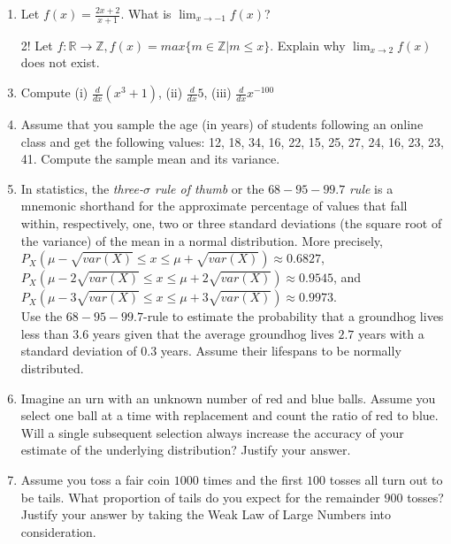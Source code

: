 \documentclass{article}
\begin{document}
\begin{enumerate}
	\item Let $f(x) = \frac{2x + 2}{x + 1}$. What is $\lim_{x \to -1} f(x)$?
	\item[2!] Let $f: \mathbb{R} \to \mathbb{Z}, f(x) = max\{m \in \mathbb{Z} | m \leq x\}$. Explain why $\lim_{x \to 2} f(x)$ does not exist. 
	\item Compute (i) $\frac{d}{dx}(x^3 + 1)$, (ii) $\frac{d}{dx}5$, (iii) $\frac{d}{dx} x^{-100}$
	\item Assume that you sample the age (in years) of students following an online class and get the following values: 12, 18, 34, 16, 22, 15, 25, 27, 24, 16, 23, 23, 41. Compute the sample mean and its variance.
	\item In statistics, the {\em three-$\sigma$ rule of thumb} or the $68-95-99.7$ {\em rule} is a mnemonic shorthand for the approximate percentage of values that fall within, respectively, one, two or three standard deviations (the square root of the variance) of the mean in a normal distribution. More precisely, $P_X(\mu - \sqrt{var(X)} \leq x \leq \mu + \sqrt{var(X)}) \approx 0.6827$,  $P_X(\mu - 2\sqrt{var(X)} \leq x \leq \mu + 2\sqrt{var(X)}) \approx 0.9545$, and $P_X(\mu - 3\sqrt{var(X)} \leq x \leq \mu + 3\sqrt{var(X)}) \approx 0.9973$.\\ Use the $68-95-99.7$-rule to estimate the probability that a groundhog lives less than $3.6$ years given that the average groundhog lives $2.7$ years with a standard deviation of $0.3$ years. Assume their lifespans to be normally distributed.
	\item Imagine an urn with an unknown number of red and blue balls. Assume you select one ball at a time with replacement and count the ratio of red to blue. Will a single subsequent selection always increase the accuracy of your estimate of the underlying distribution? Justify your answer.  
	\item Assume you toss a fair coin $1000$ times and the first $100$ tosses all turn out to be tails. What proportion of tails do you expect for the remainder $900$ tosses? Justify your answer by taking the Weak Law of Large Numbers into consideration. 
\end{enumerate}		
\end{document}
